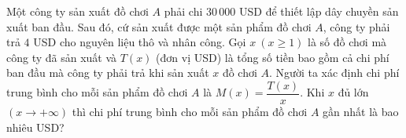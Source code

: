 \begin{bt}%
	Một công ty sản xuất đồ chơi $A$ phải chi $30\,000$ USD để thiết lập dây chuyền sản xuất ban đầu. Sau đó, cứ sản xuất được một sản phẩm đồ chơi $A$, công ty phải trả $4$ USD cho nguyên liệu thô và nhân công. Gọi $x \ (x \geq 1)$ là số đồ chơi mà công ty đã sản xuất và $T(x)$ (đơn vị USD) là tổng số tiền bao gồm cả chi phí ban đầu mà công ty phải trả khi sản xuất $x$ đồ chơi $A$. Người ta xác định chi phí trung bình cho mỗi sản phẩm đồ chơi $A$ là $M(x) = \dfrac{T(x)}{x}$. Khi $x$ đủ lớn $(x \to +\infty)$ thì chi phí trung bình cho mỗi sản phẩm đồ chơi $A$ gần nhất là bao nhiêu USD?
\end{bt}

